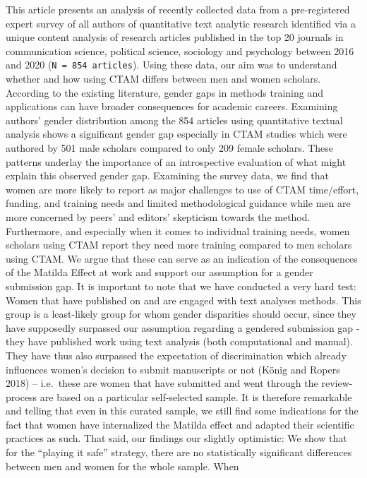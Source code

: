 \documentclass[
]{ccr}
\begin{document}
This article presents an analysis of recently collected data from a
pre-registered expert survey of all authors of quantitative text
analytic research identified via a unique content analysis of research
articles published in the top 20 journals in communication science,
political science, sociology and psychology between 2016 and 2020
(\texttt{N\ =\ 854\ articles}). Using these data, our aim was to
understand whether and how using CTAM differs between men and women
scholars. According to the existing literature, gender gaps in methods
training and applications can have broader consequences for academic
careers. Examining authors' gender distribution among the 854 articles
using quantitative textual analysis shows a significant gender gap
especially in CTAM studies which were authored by 501 male scholars
compared to only 209 female scholars. These patterns underlay the
importance of an introspective evaluation of what might explain this
observed gender gap. Examining the survey data, we find that women are
more likely to report as major challenges to use of CTAM time/effort,
funding, and training needs and limited methodological guidance while
men are more concerned by peers' and editors' skepticism towards the
method. Furthermore, and especially when it comes to individual training
needs, women scholars using CTAM report they need more training compared
to men scholars using CTAM. We argue that these can serve as an
indication of the consequences of the Matilda Effect at work and support
our assumption for a gender submission gap. It is important to note that
we have conducted a very hard test: Women that have published on and are
engaged with text analyses methods. This group is a least-likely group
for whom gender disparities should occur, since they have supposedly
surpassed our assumption regarding a gendered submission gap - they have
published work using text analysis (both computational and manual). They
have thus also surpassed the expectation of discrimination which already
influences women's decision to submit manuscripts or not (König and
Ropers 2018) -- i.e.~these are women that have submitted and went
through the review-process are based on a particular self-selected
sample. It is therefore remarkable and telling that even in this curated
sample, we still find some indications for the fact that women have
internalized the Matilda effect and adapted their scientific practices
as such. That said, our findings our slightly optimistic: We show that
for the ``playing it safe'' strategy, there are no statistically
significant differences between men and women for the whole sample. When
\end{document}
